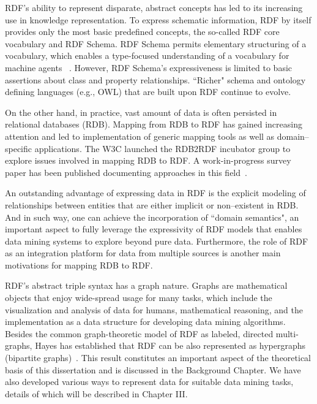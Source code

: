 \begin{enumerate}
    RDF's ability to represent disparate, abstract concepts has led to its increasing use in knowledge representation. To express schematic information, RDF by itself provides only the most basic predefined concepts, the so-called RDF core vocabulary and RDF Schema. RDF Schema permits elementary structuring of a vocabulary, which enables a type-focused understanding of a vocabulary for machine agents %
    ~\cite{GraphModelRDF}. However, RDF Schema's expressiveness is limited to basic assertions about class and property relationships. ``Richer" schema and ontology defining languages (e.g., OWL) that are built upon RDF continue to evolve. %

    On the other hand, in practice, vast amount of data is often persisted in relational databases (RDB). Mapping from RDB to RDF has gained increasing attention and led to implementation of generic mapping tools as well as domain--specific applications.  The W3C launched the RDB2RDF incubator group to explore issues involved in mapping RDB to RDF. A work-in-progress survey paper has been published documenting approaches in this field~\cite{RDB2RDF}.

    An outstanding advantage of expressing data in RDF is the explicit modeling of relationships between entities that are either implicit or non--existent in RDB. And in such way, one can achieve the incorporation of ``domain semantics", an important aspect to fully leverage the expressivity of RDF models that enables data mining systems to explore beyond pure data. Furthermore, the role of RDF as an integration platform for data from multiple sources is another main motivations for mapping RDB to RDF.

    RDF's abstract triple syntax has a graph nature. Graphs are mathematical objects that enjoy wide-spread usage for many tasks, which include the visualization and analysis of data for humans, mathematical reasoning, and the implementation as a data structure for developing data mining algorithms. Besides the common graph-theoretic model of RDF as labeled, directed multi-graphs, Hayes has established that RDF can be also represented as hypergraphs (bipartite graphs)~\cite{GraphModelRDF}. This result constitutes an important aspect of the theoretical basis of this dissertation and is discussed in the Background Chapter. We have also developed various ways to represent data for suitable data mining tasks, details of which will be described in Chapter III.


\end{enumerate}
